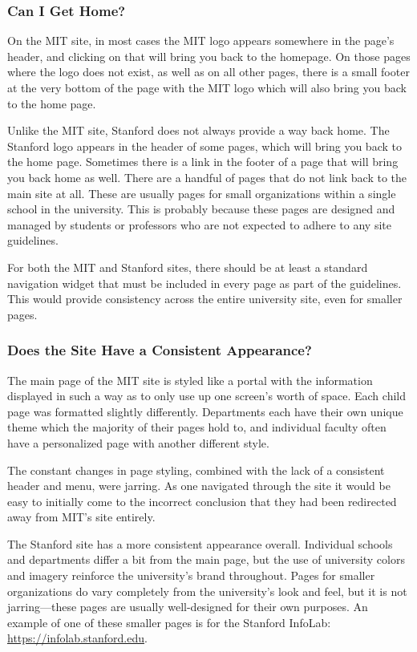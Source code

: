 \subsubsection*{Can I Get Home?}

On the MIT site, in most cases the MIT logo appears somewhere in the page's header, and clicking on that
will bring you back to the homepage. On those pages where the logo does not exist, as well as
on all other pages, there is a small footer at the very bottom of the page with the MIT logo
which will also bring you back to the home page.

Unlike the MIT site, Stanford does not always provide a way back home. The Stanford
logo appears in the header of some pages, which will bring you back to the home
page. Sometimes there is a link in the footer of a page that will bring you back
home as well. There are a handful of pages that do not link back to the main
site at all. These are usually pages for small organizations within a single
school in the university. This is probably because these pages are designed and
managed by students or professors who are not expected to adhere to any site
guidelines.

For both the MIT and Stanford sites, there should be at least a standard navigation
widget that must be included in every page as part of the guidelines. This would
provide consistency across the entire university site, even for smaller pages.

\subsubsection*{Does the Site Have a Consistent Appearance?}

The main page of the MIT site is styled like a portal with the information displayed in such a way as to
only use up one screen's worth of space. Each child page was formatted slightly differently.
Departments each have their own unique theme which the majority of their pages hold to, and
individual faculty often have a personalized page with another different style.

The constant changes in page styling, combined with the lack of a consistent header and
menu, were jarring. As one navigated through the site it would be easy to initially
come to the incorrect conclusion that they had been redirected away from MIT's site entirely.

The Stanford site has a more consistent appearance overall. Individual schools and
departments differ a bit from the main page, but the use of university colors and imagery
reinforce the university's brand throughout. Pages for smaller organizations do
vary completely from the university's look and feel, but it is not jarring---these
pages are usually well-designed for their own purposes. An example of one of these
smaller pages is for the Stanford InfoLab: \url{https://infolab.stanford.edu}.

